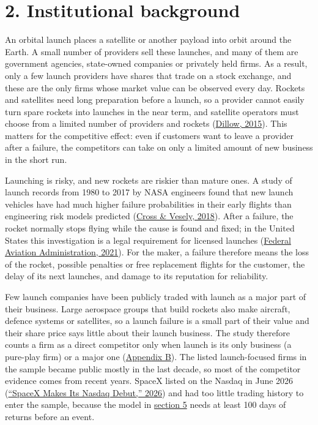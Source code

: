 \documentclass[12pt,a4paper]{article}
\begin{document}
\section*{\hypertarget{s2}{}2. Institutional background}
An orbital launch places a satellite or another payload into orbit around the Earth. A small number of providers sell these launches, and many of them are government agencies, state-owned companies or privately held firms. As a result, only a few launch providers have shares that trade on a stock exchange, and these are the only firms whose market value can be observed every day. Rockets and satellites need long preparation before a launch, so a provider cannot easily turn spare rockets into launches in the near term, and satellite operators must choose from a limited number of providers and rockets (\hyperlink{ref-dillow2015}{Dillow, 2015}). This matters for the competitive effect: even if customers want to leave a provider after a failure, the competitors can take on only a limited amount of new business in the short run.

Launching is risky, and new rockets are riskier than mature ones. A study of launch records from 1980 to 2017 by NASA engineers found that new launch vehicles have had much higher failure probabilities in their early flights than engineering risk models predicted (\hyperlink{ref-cross2018}{Cross \& Vesely, 2018}). After a failure, the rocket normally stops flying while the cause is found and fixed; in the United States this investigation is a legal requirement for licensed launches (\hyperlink{ref-faa2021}{Federal Aviation Administration, 2021}). For the maker, a failure therefore means the loss of the rocket, possible penalties or free replacement flights for the customer, the delay of its next launches, and damage to its reputation for reliability.

Few launch companies have been publicly traded with launch as a major part of their business. Large aerospace groups that build rockets also make aircraft, defence systems or satellites, so a launch failure is a small part of their value and their share price says little about their launch business. The study therefore counts a firm as a direct competitor only when launch is its only business (a pure-play firm) or a major one (\hyperlink{apx-b}{Appendix B}). The listed launch-focused firms in the sample became public mostly in the last decade, so most of the competitor evidence comes from recent years. SpaceX listed on the Nasdaq in June 2026 (\hyperlink{ref-euronews2026}{“SpaceX Makes Its Nasdaq Debut,” 2026}) and had too little trading history to enter the sample, because the model in \hyperlink{s5}{section 5} needs at least 100 days of returns before an event.
\end{document}
